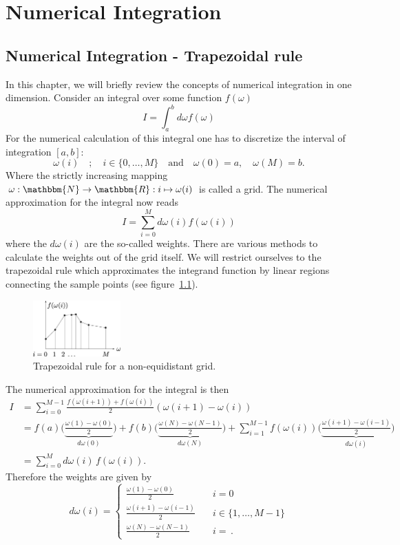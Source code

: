 \chapter{Numerical Integration}\label{chapter:numerical_integraion}
\section{Numerical Integration - Trapezoidal rule}
In this chapter, we will briefly review the concepts of numerical integration in one dimension. Consider an integral over some function $f(\omega)$
\begin{equation}
	I=\int_a^b d\omega f(\omega)
\end{equation}
For the numerical calculation of this integral one has to discretize the interval of integration $[a,b]$:
\[
	\omega(i) \quad;\quad i\in\{0,\dots,M\}\quad\text{and}\quad \omega(0)=a,\quad \omega(M)=b.
\]
Where the strictly increasing mapping $\omega: \mathbbm{N} \to \mathbbm{R}: i \mapsto \omega(i)$ is called a grid. The numerical approximation for the integral now reads
\begin{equation} 
	I=\sum_{i=0}^M d\omega(i) f(\omega(i))
\end{equation}
where the $d\omega(i)$ are the so-called weights. There are various methods to calculate the weights out of the grid itself. We will restrict ourselves to the trapezoidal rule which approximates the integrand function by linear regions connecting the sample points (see figure~\ref{fig:trapezoidal_rule}).
\begin{figure}[ht]
	\centering
	\includegraphics[width=0.3\textwidth]{pics/trapez.eps}
	\caption{Trapezoidal rule for a non-equidistant grid.}
	\label{fig:trapezoidal_rule}
\end{figure}

The numerical approximation for the integral is then
\begin{align*}
	I&=\sum_{i=0}^{M-1} \frac{f(\omega(i+1)) + f(\omega(i))}{2} (\omega(i+1)-\omega(i)) \\
	&=f(a)\biggl( \underbrace{\frac{\omega(1)-\omega(0)}{2}}_{d\omega(0)}\biggr) + f(b) \biggl( \underbrace{\frac{\omega(N)-\omega(N-1)}{2}}_{d\omega(N)}\biggr) + \sum_{i=1}^{M-1} f(\omega(i)) \biggl( \underbrace{\frac{\omega(i+1)-\omega(i-1)}{2}}_{d\omega(i)}\biggr)\\
	&=\sum_{i=0}^{M} d\omega(i)\,f(\omega(i)).
\end{align*}
Therefore the weights are given by
\[
	d\omega(i)=\begin{cases}
		\frac{\omega(1)-\omega(0)}{2} \quad &i=0\\
		\frac{\omega(i+1)-\omega(i-1)}{2} \quad &i\in \{1,\dots,M-1\}  \\
		\frac{\omega(N)-\omega(N-1)}{2} \quad &i=\,.
	\end{cases}
\]

